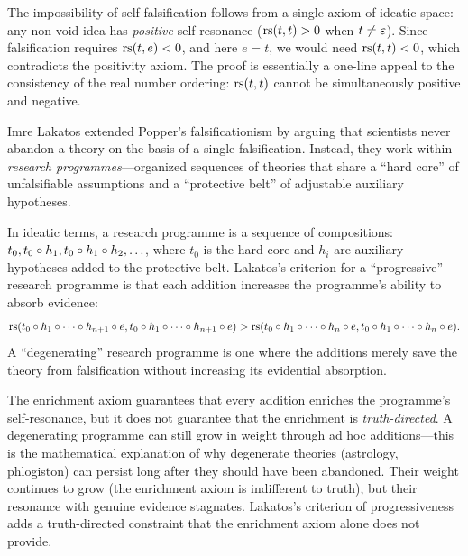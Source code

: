 \begin{remark}
The impossibility of self-falsification follows from a single axiom of ideatic
space: any non-void idea has \emph{positive} self-resonance ($\mathrm{rs}(t,t) > 0$
when $t \neq \varepsilon$). Since falsification requires $\mathrm{rs}(t,e) < 0$, and here
$e = t$, we would need $\mathrm{rs}(t,t) < 0$, which contradicts the positivity axiom.
The proof is essentially a one-line appeal to the consistency of the real number
ordering: $\mathrm{rs}(t,t)$ cannot be simultaneously positive and negative.
\end{remark}

\begin{remark}
Imre Lakatos extended Popper's falsificationism by arguing that scientists never
abandon a theory on the basis of a single falsification. Instead, they work
within \emph{research programmes}---organized sequences of theories that share
a ``hard core'' of unfalsifiable assumptions and a ``protective belt'' of
adjustable auxiliary hypotheses.

In ideatic terms, a research programme is a sequence of compositions:
$t_0, t_0 \circ h_1, t_0 \circ h_1 \circ h_2, \ldots$, where $t_0$
is the hard core and $h_i$ are auxiliary hypotheses added to the protective belt.
Lakatos's criterion for a ``progressive'' research programme is that each
addition increases the programme's ability to absorb evidence:
\[
  \mathrm{rs}(t_0 \circ h_1 \circ \cdots \circ h_{n+1} \circ e, t_0 \circ h_1 \circ \cdots \circ h_{n+1} \circ e)
  > \mathrm{rs}(t_0 \circ h_1 \circ \cdots \circ h_n \circ e, t_0 \circ h_1 \circ \cdots \circ h_n \circ e).
\]
A ``degenerating'' research programme is one where the additions merely save the
theory from falsification without increasing its evidential absorption.

The enrichment axiom guarantees that every addition enriches the programme's
self-resonance, but it does not guarantee that the enrichment is \emph{truth-directed}.
A degenerating programme can still grow in weight through ad hoc additions---this
is the mathematical explanation of why degenerate theories (astrology, phlogiston)
can persist long after they should have been abandoned. Their weight continues to
grow (the enrichment axiom is indifferent to truth), but their resonance with
genuine evidence stagnates. Lakatos's criterion of progressiveness adds a
truth-directed constraint that the enrichment axiom alone does not provide.
\end{remark}

